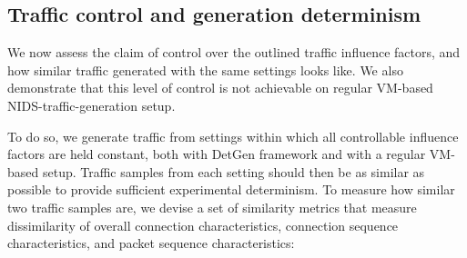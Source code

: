 \documentclass[sigconf]{acmart}
\begin{document}
\subsection{Traffic control and generation determinism}
We now assess the claim of control over the outlined traffic influence factors, and how similar traffic generated with the same settings looks like. We also demonstrate that this level of control is not achievable on regular VM-based NIDS-traffic-generation setup.

To do so, we generate traffic from settings within which all controllable influence factors are held constant, both with DetGen framework and with a regular VM-based setup. Traffic samples from each setting should then be as similar as possible to provide sufficient experimental determinism. To measure how similar two traffic samples are, we devise a set of similarity metrics that measure dissimilarity of overall connection characteristics, connection sequence characteristics, and packet sequence characteristics:




\end{document}
